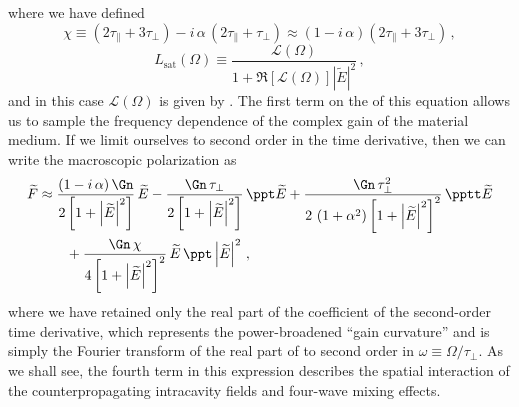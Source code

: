 where we have defined
\begin{equation} \label{eqn:mflt_chi_def}
        \chi \equiv \left(2 \tau_\parallel + 3 \tau_\perp\right) - i\, \alpha\, \left(2 \tau_\parallel + \tau_\perp\right) \approx (1 - i\, \alpha) \left(2 \tau_\parallel + 3 \tau_\perp\right)\, ,
\end{equation}
\begin{equation} \label{eqn:laser_dynamics_1d_mfl_Lsat_def}
    L_\mathrm{sat}(\Omega) \equiv \frac{\mathcal{L}(\Omega)}{1 + \Re[\mathcal{L}(\Omega)] \left|\widetilde{E}\right|^2}\, ,
\end{equation}
and in this case $\mathcal{L}(\Omega)$ is given by . The first term on the \rhs of this equation allows us to sample the frequency dependence of the complex gain of the material medium. If we limit ourselves to second order in the time derivative, then we can write the macroscopic polarization as
\begin{equation} \label{eqn:ftilde_mflt_def}
    \begin{split}
        \widetilde{F} &\approx \frac{(1 - i\, \alpha)\, \Gn}{2 \left[ 1 + \left|\widetilde{E}\right|^2 \right]}\, \widetilde{E} - \frac{\Gn\, \tau_\perp}{2 \left[1 + \left|\widetilde{E}\right|^2\right]}\, \ppt \widetilde{E}  + \frac{\Gn\, \tau_\perp^2}{2\, \left(1 + \alpha^2\right) \left[1 + \left|\widetilde{E}\right|^2\right]^2}\, \pptt \widetilde{E} \\
        &\qquad + \frac{\Gn\, \chi}{4 \left[1 + \left|\widetilde{E}\right|^2\right]^2}\, \widetilde{E}\, \ppt \left|\widetilde{E}\right|^2\, ,
    \end{split}
\end{equation}
where we have retained only the real part of the coefficient of the second-order time derivative, which represents the power-broadened ``gain curvature'' and is simply the Fourier transform of the real part of  to second order in $\omega \equiv \Omega / \tau_\perp$.  As we shall see, the fourth term in this expression describes the spatial interaction of the counterpropagating intracavity fields and four-wave mixing effects.
